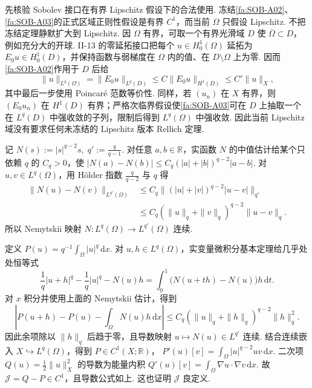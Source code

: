 先核验 Sobolev 接口在有界 Lipschitz 假设下的合法使用. 冻结\autoref{fa:SOB-A02}、\autoref{fa:SOB-A03}的正式区域正则性假设是有界 \(\displaystyle C^1\)，而当前 \(\displaystyle\Omega\) 只假设 Lipschitz. 不把冻结定理静默扩大到 Lipschitz. 因 \(\displaystyle\Omega\) 有界，可取一个有界光滑域 \(\displaystyle D\) 使 \(\displaystyle\overline\Omega\subset D\)，例如充分大的开球. II-13 的零延拓接口把每个 \(\displaystyle u\in H_0^1(\Omega)\) 延拓为 \(\displaystyle E_0u\in H_0^1(D)\)，并保持函数与弱梯度在 \(\displaystyle\Omega\) 内的值、在 \(\displaystyle D\setminus\Omega\) 上为零. 因而\autoref{fa:SOB-A02}作用于 \(\displaystyle D\) 后给
\[
\|u\|_{L^q(\Omega)}
=
\|E_0u\|_{L^q(D)}
\leqslant
C\|E_0u\|_{H^1(D)}
\leqslant
C'\|u\|_X,
\]
其中最后一步使用 Poincaré 范数等价性. 同样，若 \(\displaystyle(u_n)\) 在 \(\displaystyle X\) 有界，则 \(\displaystyle(E_0u_n)\) 在 \(\displaystyle H^1(D)\) 有界；严格次临界假设使\autoref{fa:SOB-A03}可在 \(\displaystyle D\) 上抽取一个在 \(\displaystyle L^q(D)\) 中强收敛的子列，限制后得到 \(\displaystyle L^q(\Omega)\) 中强收敛. 因此当前 Lipschitz 域没有要求任何未冻结的 Lipschitz 版本 Rellich 定理.

记
\(\displaystyle N(s):=|s|^{q-2}s, \; q':=\frac{q}{q-1}\).
对任意 \(\displaystyle a,b\in\mathbb R\)，实函数 \(\displaystyle N\) 的中值估计给某个只依赖 \(\displaystyle q\) 的 \(\displaystyle C_q>0\)，使
\(\displaystyle |N(a)-N(b)| \leqslant C_q(|a|+|b|)^{q-2}|a-b|\).
对 \(\displaystyle u,v\in L^q(\Omega)\)，用 Hölder 指数 \(\displaystyle \frac{q}{q-2}\) 与 \(\displaystyle q\) 得
\[
\begin{aligned}
\displaystyle \|N(u)-N(v)\|_{L^{q'}(\Omega)}
&\leqslant\displaystyle
C_q\|(|u|+|v|)^{q-2}|u-v|\|_{q'}\\
&\leqslant\displaystyle
C_q(\|u\|_q+\|v\|_q)^{q-2}\|u-v\|_q.
\end{aligned}
\]
所以 Nemytskii 映射 \(\displaystyle N:L^q(\Omega)\to L^{q'}(\Omega)\) 连续.

定义 \(\displaystyle P(u)=q^{-1}\int_\Omega|u|^q\,\mathrm{d}x\). 对 \(\displaystyle u,h\in L^q(\Omega)\)，实变量微积分基本定理给几乎处处恒等式
\[
\frac{1}{q}|u+h|^q-
\frac{1}{q}|u|^q-
N(u)h
=
\int_0^1\bigl(N(u+th)-N(u)\bigr)h\,\mathrm{d}t.
\]
对 \(\displaystyle x\) 积分并使用上面的 Nemytskii 估计，得到
\[
\left|P(u+h)-P(u)-\int_\Omega N(u)h\,\mathrm{d}x\right|
\leqslant
C_q(\|u\|_q+\|h\|_q)^{q-2}\|h\|_q^2.
\]
因此余项除以 \(\displaystyle\|h\|_q\) 后趋于零，且导数映射 \(\displaystyle u\mapsto N(u)\in L^{q'}\) 连续. 结合连续嵌入 \(\displaystyle X\hookrightarrow L^q(\Omega)\)，得到 \(\displaystyle P\in C^1(X;\mathbb R)\)，
\(\displaystyle P'(u)[v] = \int_\Omega|u|^{q-2}uv\,\mathrm{d}x\).
二次项 \(\displaystyle Q(u)=\frac{1}{2}\|u\|_X^2\) 的导数为能量内积 \(\displaystyle Q'(u)[v]=\int_\Omega\nabla u\mathbin{\cdot}\nabla v\,\mathrm{d}x\). 故 \(\displaystyle\mathcal J=Q-P\in C^1\)，且导数公式如上. 这也证明 \(\displaystyle\mathcal J\) 良定义.

